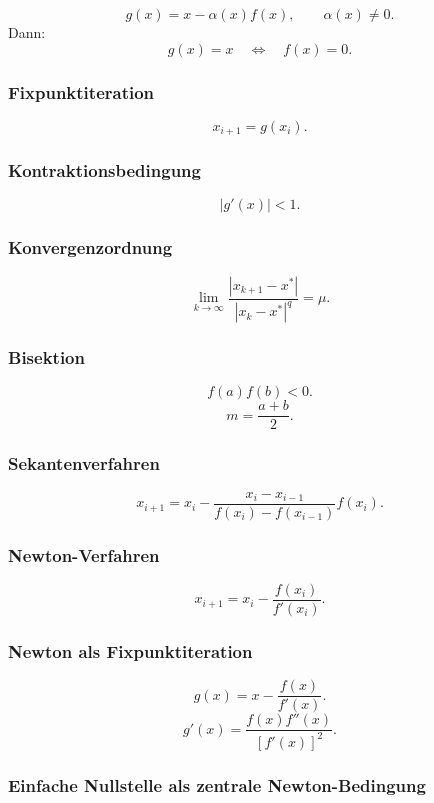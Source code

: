 \documentclass[10pt, letterpaper]{article}
\begin{document}
\[
\boxed{
g(x)=x-\alpha(x)f(x),
\qquad
\alpha(x)\neq 0.
}
\]
Dann:
\[
\boxed{
g(x)=x
\quad\Longleftrightarrow\quad
f(x)=0.
}
\]

\subsubsection{Fixpunktiteration}

\[
\boxed{
x_{i+1}=g(x_i).
}
\]

\subsubsection{Kontraktionsbedingung}

\[
\boxed{
|g'(x)|<1.
}
\]

\subsubsection{Konvergenzordnung}

\[
\boxed{
\lim_{k\to\infty}
\frac{|x_{k+1}-x^\ast|}
{|x_k-x^\ast|^q}
=
\mu.
}
\]

\subsubsection{Bisektion}

\[
\boxed{
f(a)f(b)<0.
}
\]
\[
\boxed{
m=\frac{a+b}{2}.
}
\]

\subsubsection{Sekantenverfahren}

\[
\boxed{
x_{i+1}
=
x_i
-
\frac{x_i-x_{i-1}}
{f(x_i)-f(x_{i-1})}
f(x_i).
}
\]

\subsubsection{Newton-Verfahren}

\[
\boxed{
x_{i+1}
=
x_i-\frac{f(x_i)}{f'(x_i)}.
}
\]

\subsubsection{Newton als Fixpunktiteration}

\[
\boxed{
g(x)=x-\frac{f(x)}{f'(x)}.
}
\]
\[
\boxed{
g'(x)
=
\frac{f(x)f''(x)}
{[f'(x)]^2}.
}
\]

\subsubsection{Einfache Nullstelle als zentrale Newton-Bedingung}
\end{document}
